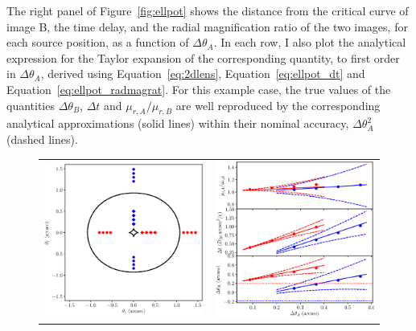\documentclass[usenatbib]{mnras}
\def\Fref#1{Figure~\ref{#1}\xspace}
\def\Eref#1{Equation~\ref{#1}\xspace}
\begin{document}
The right panel of \Fref{fig:ellpot} shows the distance from the critical curve of image B, the time delay, and the radial magnification ratio of the two images, for each source position, as a function of $\Delta\theta_A$.
In each row, I also plot the analytical expression for the Taylor expansion of the corresponding quantity, to first order in $\Delta\theta_A$, derived using \Eref{eq:2dlens}, \Eref{eq:ellpot_dt} and \Eref{eq:ellpot_radmagrat}.
For this example case, the true values of the quantities $\Delta\theta_B$, $\Delta t$ and $\mu_{r,A}/\mu_{r,B}$ are well reproduced by the corresponding analytical approximations (solid lines) within their nominal accuracy, $\Delta\theta_A^2$ (dashed lines).
%
\begin{figure}
 \begin{tabular}{cc}
 \includegraphics[width=\columnwidth]{ellpot_critcurve.eps} &
 \includegraphics[width=\columnwidth]{ellpot_plots.eps}

\end{tabular}
\end{figure}
\end{document}

